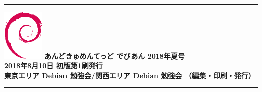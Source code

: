 \documentclass[mingoth,a4paper]{jsarticle}
\begin{document}
\vspace*{13cm}
{\color{dancerlightblue}\rule{\hsize}{1mm}}
\vspace{2mm}
\includegraphics[width=2cm]{image200502/openlogo-nd.eps}
\noindent \Large \bf あんどきゅめんてっど でびあん 2018年夏号\\
\noindent \normalfont 2018年8月10日 \hspace{5mm}  初版第1刷発行\\
\noindent \normalfont 東京エリア Debian 勉強会/関西エリア Debian 勉強会 （編集・印刷・発行）\\
{\color{dancerdarkblue}\rule{\hsize}{1mm}}
\end{document}
